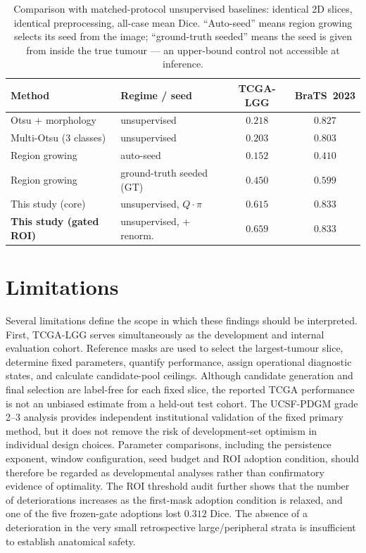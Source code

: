 \documentclass[11pt,a4paper]{article}
\begin{document}
\begin{table}[htpb!]\centering
\caption{Comparison with matched-protocol unsupervised baselines: identical 2D
slices, identical preprocessing, all-case mean Dice. ``Auto-seed'' means region
growing selects its seed from the image; ``ground-truth seeded'' means the seed is
given from inside the true tumour --- an upper-bound control not accessible at
inference.}
\label{tab:baselines}
\begin{tabular}{llcc}
\toprule
Method & Regime / seed & TCGA-LGG & BraTS~2023 \\
\midrule
Otsu $+$ morphology      & unsupervised          & $0.218$ & $0.827$ \\
Multi-Otsu (3 classes)   & unsupervised          & $0.203$ & $0.803$ \\
Region growing           & auto-seed             & $0.152$ & $0.410$ \\
Region growing           & ground-truth seeded (GT) & $0.450$ & $0.599$ \\
\midrule
This study (core)        & unsupervised, $Q\!\cdot\!\pi$ & $0.615$ & $\mathbf{0.833}$ \\
\textbf{This study (gated ROI)} & unsupervised, $+$ renorm. & $\mathbf{0.659}$ & $\mathbf{0.833}$ \\
\bottomrule
\end{tabular}
\end{table}

\fi
\fi

\section{Limitations}\label{sec:limitations}

Several limitations define the scope in which these findings should be
interpreted. First, TCGA-LGG serves simultaneously as the development and
internal evaluation cohort. Reference masks are used to select the
largest-tumour slice, determine fixed parameters, quantify performance, assign
operational diagnostic states, and calculate candidate-pool ceilings. Although candidate
generation and final selection are label-free for each fixed slice, the reported
TCGA performance is not an unbiased estimate from a held-out test cohort. The
UCSF-PDGM grade 2--3 analysis provides independent institutional validation of
the fixed primary method, but it does not remove the risk of development-set
optimism in individual design choices. Parameter comparisons, including the
persistence exponent, window configuration, seed budget and ROI adoption
condition, should therefore be regarded as developmental analyses rather than
confirmatory evidence of optimality. The ROI threshold audit further shows that
the number of deteriorations increases as the first-mask adoption condition is
relaxed, and one of the five frozen-gate adoptions lost $0.312$ Dice. The absence
of a deterioration in the very small retrospective large/peripheral strata is
insufficient to establish anatomical safety.
\end{document}
